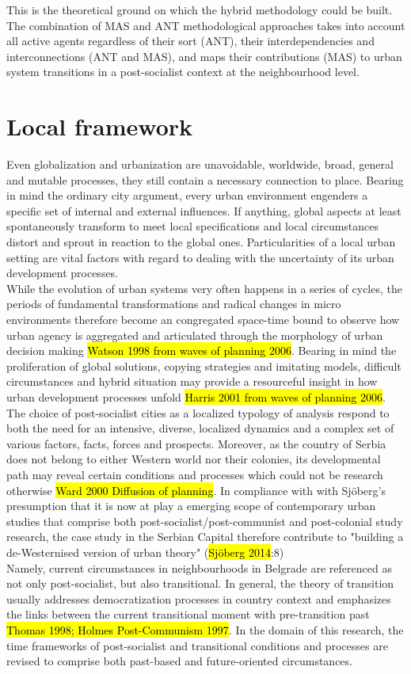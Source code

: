 \documentclass[11pt]{report}
\begin{document}
This is the theoretical ground on which the hybrid methodology could be built. The combination of MAS and ANT methodological approaches takes into account all active agents regardless of their sort (ANT), their interdependencies and interconnections (ANT and MAS), and maps their contributions (MAS) to urban system transitions  in a post-socialist context at the neighbourhood level.

\section{Local framework}

Even globalization and urbanization are unavoidable,  worldwide,  broad,  general  and  mutable  processes, they still  contain  a  necessary connection to place.
Bearing in mind the ordinary city argument, every urban environment engenders a specific set of internal and external influences.
If anything, global aspects at least spontaneously transform to meet local specifications and local circumstances distort and sprout in reaction to the global ones. Particularities of a local urban setting are vital factors with regard to dealing with the uncertainty of its urban development processes.
\\
While the evolution of urban systems very often happens in a series of cycles, the periods of fundamental transformations and radical changes in micro environments therefore become an congregated space-time bound to observe how urban agency is aggregated and articulated through the morphology of urban decision making \hl{Watson 1998 from waves of planning 2006}.
Bearing in mind the proliferation of global solutions, copying strategies and imitating models, difficult circumstances and hybrid situation may provide a resourceful insight in how urban development processes unfold \hl{Harris 2001 from waves of planning 2006}.
\\
The choice of post-socialist cities as a localized typology of analysis respond to both the need for an intensive, diverse, localized dynamics and a complex set of various factors, facts, forces and prospects.
Moreover, as the country of Serbia does not belong to either Western world nor their colonies, its developmental path may reveal certain conditions and processes which could not be research otherwise \hl{Ward 2000 Diffusion of planning}.
In compliance with with Sjöberg's presumption that it is now at play a emerging scope of contemporary urban studies that comprise both post-socialist/post-communist and post-colonial study research, the case study in the Serbian Capital therefore contribute to "building a de-Westernised version of urban theory" (\hl{Sjöberg 2014}:8)
\\
Namely, current circumstances in neighbourhoods in Belgrade are referenced as not only post-socialist, but also transitional.
In general, the theory of transition usually addresses democratization processes in country context and emphasizes the links between the current transitional moment with pre-transition past \hl{ Thomas 1998; Holmes Post-Communism 1997}.
In the domain of this research, the time frameworks of post-socialist and transitional conditions and processes are revised to comprise both past-based and future-oriented circumstances.
\end{document}
